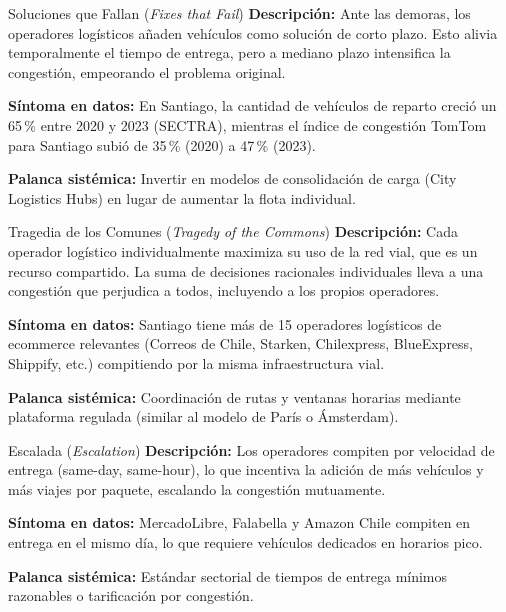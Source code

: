\documentclass[12pt,a4paper]{article}
\begin{document}
\vspace{0.5em}

\begin{arquetipobox}{Soluciones que Fallan (\textit{Fixes that Fail})}
\textbf{Descripción:} Ante las demoras, los operadores logísticos añaden
vehículos como solución de corto plazo. Esto alivia temporalmente el
tiempo de entrega, pero a mediano plazo intensifica la congestión,
empeorando el problema original.

\textbf{Síntoma en datos:} En Santiago, la cantidad de vehículos de
reparto creció un 65\,\% entre 2020 y 2023 (SECTRA), mientras el índice
de congestión TomTom para Santiago subió de 35\,\% (2020) a 47\,\% (2023).

\textbf{Palanca sistémica:} Invertir en modelos de consolidación de carga
(City Logistics Hubs) en lugar de aumentar la flota individual.
\end{arquetipobox}

\vspace{0.5em}

\begin{arquetipobox}{Tragedia de los Comunes (\textit{Tragedy of the Commons})}
\textbf{Descripción:} Cada operador logístico individualmente maximiza
su uso de la red vial, que es un recurso compartido. La suma de decisiones
racionales individuales lleva a una congestión que perjudica a todos,
incluyendo a los propios operadores.

\textbf{Síntoma en datos:} Santiago tiene más de 15 operadores logísticos
de ecommerce relevantes (Correos de Chile, Starken, Chilexpress, BlueExpress,
Shippify, etc.) compitiendo por la misma infraestructura vial.

\textbf{Palanca sistémica:} Coordinación de rutas y ventanas horarias
mediante plataforma regulada (similar al modelo de París o Ámsterdam).
\end{arquetipobox}

\vspace{0.5em}

\begin{arquetipobox}{Escalada (\textit{Escalation})}
\textbf{Descripción:} Los operadores compiten por velocidad de entrega
(same-day, same-hour), lo que incentiva la adición de más vehículos y
más viajes por paquete, escalando la congestión mutuamente.

\textbf{Síntoma en datos:} MercadoLibre, Falabella y Amazon Chile
compiten en entrega en el mismo día, lo que requiere vehículos dedicados
en horarios pico.

\textbf{Palanca sistémica:} Estándar sectorial de tiempos de entrega
mínimos razonables o tarificación por congestión.
\end{arquetipobox}
\end{document}
